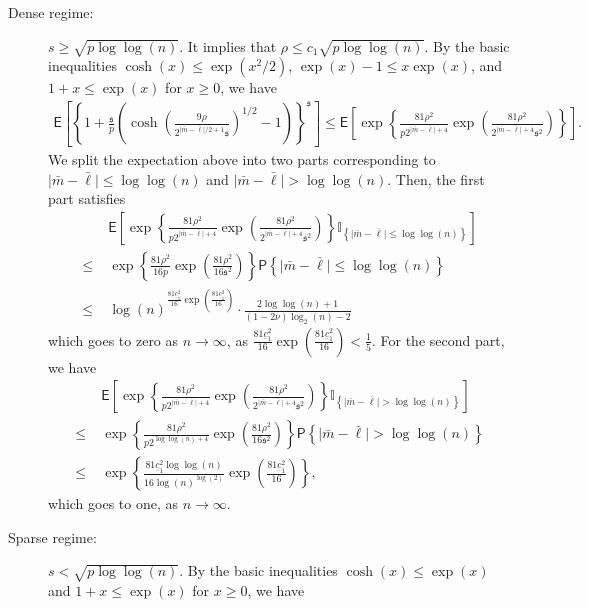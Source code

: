 \documentclass[11pt, a4paper]{article}
\renewcommand{\l}{\left}
\renewcommand{\r}{\right}
\newcommand{\E}[0]{\mathsf{E}}
\newcommand{\p}{\mathsf{P}}
\theoremstyle{definition}
\theoremstyle{definition}
\theoremstyle{definition}
\theoremstyle{definition}
\theoremstyle{definition}
\theoremstyle{remark}
\theoremstyle{definition}
\theoremstyle{definition}
\theoremstyle{definition}
\begin{document}
\begin{description}
\item[{Dense regime:}] $s \ge \sqrt{p\log\log (n)}$. 
It implies that $\rho \le c_1\sqrt{p\log\log(n)}$. By the basic inequalities $\cosh(x)\le \exp(x^2/2)$, $\exp(x) - 1 \le x\exp(x)$, and $1 +x\le \exp(x)$ for $x\ge 0$, we have 
\begin{align*}
\E\l[\l\{ 1 + \frac{\mathfrak{s}}{p}\l( \cosh\l( \frac{9\rho  }{2^{\vert \bar{m}-\bar{\ell}\vert/2+1}\mathfrak{s}}\r)^{1/2} - 1 \r)\r\}^{\mathfrak{s}}\r]
\le \E\l[\exp\l\{ \frac{81\rho^2}{p2^{\vert \bar{m}-\bar{\ell}\vert+4}}\exp\l( \frac{81\rho^2  }{2^{\vert \bar{m}-\bar{\ell}\vert+4}\mathfrak{s}^2}\r)\r\}\r].
\end{align*}
We split the expectation above into two parts corresponding to $\vert\bar{m}-\bar{\ell}\vert \le \log\log(n)$ and  $\vert\bar{m}-\bar{\ell}\vert > \log\log (n)$. Then, the first part satisfies
\begin{align*}
& \E\l[ \exp\l\{ \frac{81\rho^2}{p2^{\vert \bar{m}-\bar{\ell}\vert+4}}\exp\l( \frac{81\rho^2  }{2^{\vert \bar{m}-\bar{\ell}\vert+4}\mathfrak{s}^2}\r)\r\}\mathbb{I}_{\l\{\vert\bar{m}-\bar{\ell}\vert \le \log\log(n)\r\}}\r] \\
\le\; & \exp\l\{\frac{81\rho^2}{16 p}\exp\l(\frac{81\rho^2}{16\mathfrak{s}^2}\r)\r\} \p\l\{\vert\bar{m}-\bar{\ell}\vert \le \log\log(n)\r\} \\
\le\; &\log(n)^{\frac{81\underline{c}_1^2}{16}\exp\l(\frac{81\underline{c}_1^2}{16}\r)}\cdot\frac{2\log\log (n) +1}{(1-2\nu)\log_2(n) - 2 }
\end{align*}
which goes to zero as $n\to\infty$, as $\frac{81\underline{c}_1^2}{16}\exp\l(\frac{81\underline{c}_1^2}{16}\r) < \frac{1}{5}$. For the second part, we have 
\begin{align*}
& \E\l[ \exp\l\{\frac{81\rho^2}{p2^{\vert \bar{m}-\bar{\ell}\vert+4}}\exp\l( \frac{81\rho^2  }{2^{\vert \bar{m}-\bar{\ell}\vert+4}\mathfrak{s}^2}\r)\r\}\mathbb{I}_{\l\{\vert\bar{m}-\bar{\ell}\vert > \log\log(n)\r\}}\r] \\
\le\;& \exp\l\{\frac{81\rho^2}{p2^{\log\log(n)+4}}\exp\l(\frac{81\rho^2}{16\mathfrak{s}^2}\r)\r\} \p\l\{\vert\bar{m}-\bar{\ell}\vert > \log\log(n)\r\} \\
\le \; & \exp\l\{\frac{81\underline{c}_1^2\log\log(n)}{16\log(n)^{\log(2)}}\exp\l(\frac{81\underline{c}_1^2}{16}\r)\r\},
\end{align*}
which goes to one, as $n\to\infty$.
\item[{Sparse regime:}] $s < \sqrt{p\log\log (n)}$. By the basic inequalities $\cosh(x)\le \exp(x)$ and $1+x \le \exp(x)$ for $x\ge 0$, we have 

\end{description}
\end{document}
